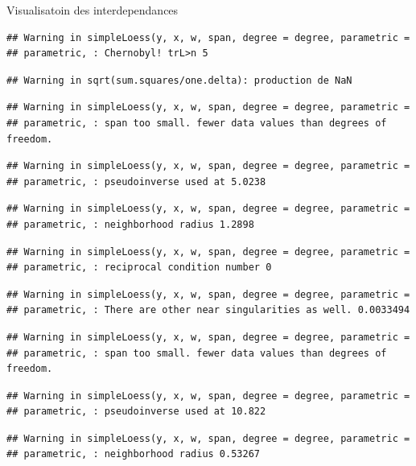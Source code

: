 \documentclass[11pt,ignorenonframetext,]{beamer}
\begin{document}
\begin{frame}[fragile]{Visualisatoin des interdependances}
\begin{verbatim}
## Warning in simpleLoess(y, x, w, span, degree = degree, parametric =
## parametric, : Chernobyl! trL>n 5
\end{verbatim}

\begin{verbatim}
## Warning in sqrt(sum.squares/one.delta): production de NaN
\end{verbatim}

\begin{verbatim}
## Warning in simpleLoess(y, x, w, span, degree = degree, parametric =
## parametric, : span too small. fewer data values than degrees of freedom.
\end{verbatim}

\begin{verbatim}
## Warning in simpleLoess(y, x, w, span, degree = degree, parametric =
## parametric, : pseudoinverse used at 5.0238
\end{verbatim}

\begin{verbatim}
## Warning in simpleLoess(y, x, w, span, degree = degree, parametric =
## parametric, : neighborhood radius 1.2898
\end{verbatim}

\begin{verbatim}
## Warning in simpleLoess(y, x, w, span, degree = degree, parametric =
## parametric, : reciprocal condition number 0
\end{verbatim}

\begin{verbatim}
## Warning in simpleLoess(y, x, w, span, degree = degree, parametric =
## parametric, : There are other near singularities as well. 0.0033494
\end{verbatim}

\begin{verbatim}
## Warning in simpleLoess(y, x, w, span, degree = degree, parametric =
## parametric, : span too small. fewer data values than degrees of freedom.
\end{verbatim}

\begin{verbatim}
## Warning in simpleLoess(y, x, w, span, degree = degree, parametric =
## parametric, : pseudoinverse used at 10.822
\end{verbatim}

\begin{verbatim}
## Warning in simpleLoess(y, x, w, span, degree = degree, parametric =
## parametric, : neighborhood radius 0.53267
\end{verbatim}


\end{frame}
\end{document}
